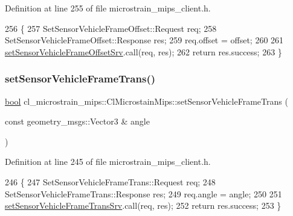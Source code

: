 Definition at line 255 of file microstrain\+\_\+mips\+\_\+client.\+h.


\begin{DoxyCode}
256     \{
257         SetSensorVehicleFrameOffset::Request req;
258         SetSensorVehicleFrameOffset::Response res;
259         req.offset = offset;
260 
261         \hyperlink{classcl__microstrain__mips_1_1ClMicrostainMips_a977cce1917e12d96f614266baa4ae55d}{setSensorVehicleFrameOffsetSrv}.call(req, res);
262         \textcolor{keywordflow}{return} res.success;
263     \}
\end{DoxyCode}
\mbox{\label{classcl__microstrain__mips_1_1ClMicrostainMips_a4dd8966794ba1697319f0f1812160405}} 
\subsubsection{\texorpdfstring{set\+Sensor\+Vehicle\+Frame\+Trans()}{setSensorVehicleFrameTrans()}}
{\footnotesize\ttfamily \hyperlink{classbool}{bool} cl\+\_\+microstrain\+\_\+mips\+::\+Cl\+Microstain\+Mips\+::set\+Sensor\+Vehicle\+Frame\+Trans (\begin{DoxyParamCaption}\item[{const geometry\+\_\+msgs\+::\+Vector3 \&}]{angle }\end{DoxyParamCaption})\hspace{0.3cm}{\ttfamily [inline]}}



Definition at line 245 of file microstrain\+\_\+mips\+\_\+client.\+h.


\begin{DoxyCode}
246     \{
247         SetSensorVehicleFrameTrans::Request req;
248         SetSensorVehicleFrameTrans::Response res;
249         req.angle = angle;
250 
251         \hyperlink{classcl__microstrain__mips_1_1ClMicrostainMips_ac020b44e78addaa26beb44081d99f194}{setSensorVehicleFrameTransSrv}.call(req, res);
252         \textcolor{keywordflow}{return} res.success;
253     \}
\end{DoxyCode}
\mbox{\label{classcl__microstrain__mips_1_1ClMicrostainMips_a24996ea87cf409ae0a912931dc088eb2}} 
